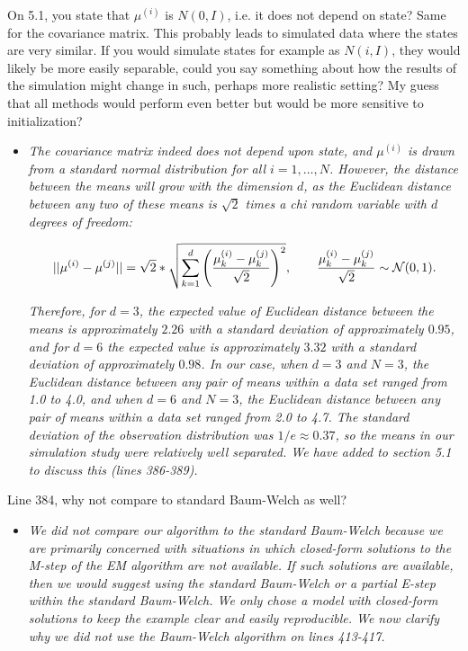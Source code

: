 \documentclass[11pt]{article}
\begin{document}
On 5.1, you state that $\mu^{(i)}$ is $N(0, I)$, i.e. it does not depend on state? Same for the covariance matrix. This probably leads to simulated data where the states are very similar. If you would simulate states for example as $N(i, I)$, they would likely be more easily separable, could you say something about how the results of the simulation might change in such, perhaps more realistic setting? My guess that all methods would perform even better but would be more sensitive to initialization?

\begin{itemize}
    \item \textit{The covariance matrix indeed does not depend upon state, and $\mu^{(i)}$ is drawn from a standard normal distribution for all $i = 1,\ldots,N$. However, the distance between the means will grow with the dimension $d$, as the Euclidean distance between any two of these means is $\sqrt{2}$ times a chi random variable with $d$ degrees of freedom:}

    $$||\mu^{(i)} - \mu^{(j)}|| = \sqrt{2} * \sqrt{\sum_{k = 1}^d \left(\frac{\mu_k^{(i)} - \mu_k^{(j)}}{\sqrt{2}}\right)^2}, \qquad \frac{\mu_k^{(i)} - \mu_k^{(j)}}{\sqrt{2}} \sim \mathcal{N}(0,1).$$

    \textit{Therefore, for $d = 3$, the expected value of Euclidean distance between the means is approximately $2.26$ with a standard deviation of approximately $0.95$, and for $d = 6$ the expected value is approximately $3.32$ with a standard deviation of approximately $0.98$. In our case, when $d = 3$ and $N = 3$, the Euclidean distance between any pair of means within a data set ranged from 1.0 to 4.0, and when $d = 6$ and $N = 3$, the Euclidean distance between any pair of means within a data set ranged from 2.0 to 4.7. The standard deviation of the observation distribution was $1/e \approx 0.37$, so the means in our simulation study were relatively well separated. We have added to section 5.1 to discuss this (lines 386-389).}
\end{itemize}

Line 384, why not compare to standard Baum-Welch as well?

\begin{itemize}
    \item \textit{We did not compare our algorithm to the standard Baum-Welch because we are primarily concerned with situations in which closed-form solutions to the M-step of the EM algorithm are not available. If such solutions are available, then we would suggest using the standard Baum-Welch or a partial E-step within the standard Baum-Welch. We only chose a model with closed-form solutions to keep the example clear and easily reproducible. We now clarify why we did not use the Baum-Welch algorithm on lines 413-417.}
\end{itemize}
\end{document}
